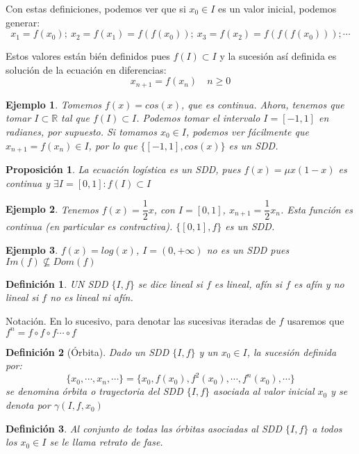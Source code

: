 \documentclass[11pt, a4paper]{article}
\newif\IfInSansMode
\numberwithin{equation}{section}
\newcommand{\R}{\mathbb{R}}
\theoremstyle{theorem-style}
\newtheorem{nprop}{Proposición}[section]
\theoremstyle{definition-style}
\newtheorem{ndef}{Definición}[section]
\theoremstyle{remark-style}
\theoremstyle{example-style}
\newtheorem{ejemplo}{Ejemplo}[section]
\begin{document}
Con estas definiciones, podemos ver que si $x_0 \in I$ es un valor inicial, podemos generar:
\[
x_1 = f(x_0); \ x_2 = f(x_1) = f(f(x_0)); \ x_3 = f(x_2) = f(f(f(x_0))); \cdots
\]

Estos valores están bién definidos pues $f(I) \subset I$ y la sucesión así definida es solución de la ecuación en diferencias:
\[
x_{n+1} = f(x_n) \quad n \geq 0
\]
\begin{ejemplo}
	Tomemos $f(x) = cos(x)$, que es continua. Ahora, tenemos que tomar $I \subset \R$ tal que $f(I) \subset I$. Podemos tomar el intervalo $I=[-1,1]$ en radianes, por supuesto.
	Si tomamos $x_0\in I$, podemos ver fácilmente que $x_{n+1}=f(x_n) \in I$, por lo que $\{[-1,1],cos(x)\}$ es un SDD.
\end{ejemplo}

\begin{nprop}La ecuación logística es un SDD, pues $f(x) = \mu x(1-x)$ es continua y $\exists I = [0,1]: f(I) \subset I$
	
\end{nprop}

\begin{ejemplo}
	Tenemos $f(x) = \dfrac{1}{2}x$, con $I = [0,1]$, $x_{n+1} = \dfrac{1}{2}x_n$. Esta función es continua (en particular es contractiva). $\{[0,1],f\}$ es un SDD.
\end{ejemplo}
\begin{ejemplo}
	$f(x) = log(x)$, $I=(0,+\infty)$ no es un SDD pues $Im(f) \nsubseteq Dom(f)$
\end{ejemplo}

\begin{ndef}
	UN SDD $\{I,f\}$ se dice lineal si $f$ es lineal, afín si $f$ es afín y no lineal si $f$ no es lineal ni afín.
\end{ndef}

Notación. En lo sucesivo, para denotar las sucesivas iteradas de $f$ usaremos que $f^n = f \circ f \circ f \cdots \circ f$


\begin{ndef}[Órbita]
	Dado un SDD $\{I,f\}$ y un $x_0\in I$, la sucesión definida por:
	\[
	\{x_0,\cdots, x_n , \cdots\} = \{x_0,f(x_0),f^2(x_0),\cdots, f^n(x_0), \cdots\}
	\]
	se denomina órbita o trayectoria del SDD $\{I,f\}$ asociada al valor inicial $x_0$ y se denota por $\gamma(I,f,x_0)$
\end{ndef}

\begin{ndef}
	Al conjunto de todas las órbitas asociadas al SDD $\{I,f\}$  a todos los $x_0 \in I$ se le llama retrato de fase.
\end{ndef}
\end{document}
